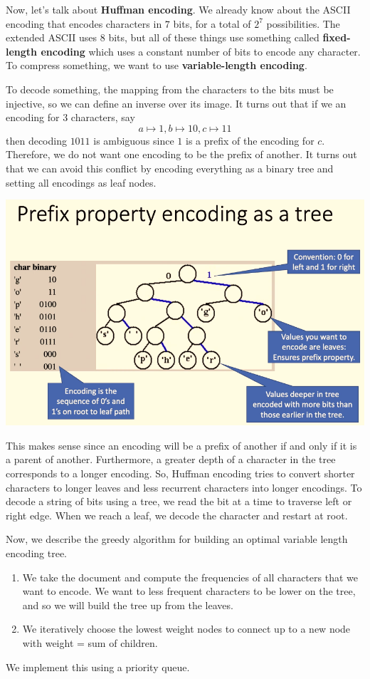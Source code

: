 \documentclass{article}
\theoremstyle{definition}
\theoremstyle{remark}
\theoremstyle{definition}
\begin{document}
Now, let's talk about \textbf{Huffman encoding}. We already know about the ASCII encoding that encodes characters in $7$ bits, for a total of $2^7$ possibilities. The extended ASCII uses $8$ bits, but all of these things use something called \textbf{fixed-length encoding} which uses a constant number of bits to encode any character. To compress something, we want to use \textbf{variable-length encoding}. 

To decode something, the mapping from the characters to the bits must be injective, so we can define an inverse over its image. It turns out that if we an encoding for 3 characters, say 
\[a \mapsto 1, b \mapsto 10, c \mapsto 11\]
then decoding $1011$ is ambiguous since $1$ is a prefix of the encoding for $c$. Therefore, we do not want one encoding to be the prefix of another. It turns out that we can avoid this conflict by encoding everything as a binary tree and setting all encodings as leaf nodes. 
\begin{center}
    \includegraphics[scale=0.5]{img/Tree_Encoding.png}
\end{center}
This makes sense since an encoding will be a prefix of another if and only if it is a parent of another. Furthermore, a greater depth of a character in the tree corresponds to a longer encoding. So, Huffman encoding tries to convert shorter characters to longer leaves and less recurrent characters into longer encodings. To decode a string of bits using a tree, we read the bit at a time to traverse left or right edge. When we reach a leaf, we decode the character and restart at root. 

Now, we describe the greedy algorithm for building an optimal variable length encoding tree. 
\begin{enumerate}
    \item We take the document and compute the frequencies of all characters that we want to encode. We want to less frequent characters to be lower on the tree, and so we will build the tree up from the leaves. 
    \item We iteratively choose the lowest weight nodes to connect up to a new node with weight = sum of children. 
\end{enumerate}
We implement this using a priority queue. 
\end{document}
